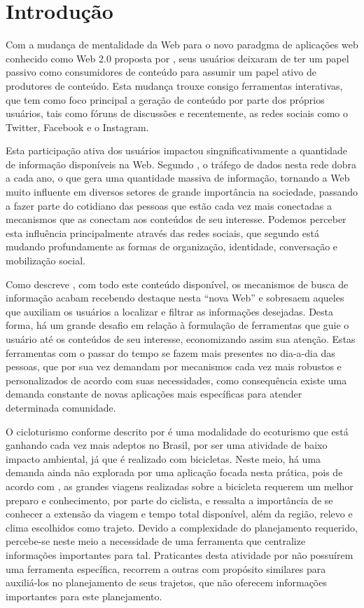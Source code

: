 \section{\esp Introdução}
Com a mudança de mentalidade da Web para o novo paradgma de aplicações web conhecido como Web 2.0 proposta por \cite{web20Proposta}, seus 
usuários deixaram de ter um papel passivo como consumidores de conteúdo para assumir um papel ativo de produtores de conteúdo. Esta mudança 
trouxe consigo ferramentas interativas, que tem como foco principal a geração de conteúdo por parte dos próprios usuários, tais como fóruns 
de discussões e recentemente, as redes sociais como o Twitter, Facebook e o Instagram.

Esta participação ativa dos usuários impactou singnificativamente a quantidade de informação disponíveis na Web. Segundo \cite{artigo01}, 
o tráfego de dados nesta rede dobra a cada ano, o que gera uma quantidade massiva de informação, tornando a Web muito influente em diversos 
setores de grande importância na sociedade, passando a fazer parte do cotidiano das pessoas que estão cada vez mais conectadas a mecanismos que
as  conectam aos conteúdos de seu interesse. Podemos perceber esta influência principalmente através das redes sociais, que segundo 
\cite{redesSociais01} está mudando profundamente as formas de organização, identidade, conversação e mobilização social.

Como descreve \cite{deitelAjax}, com todo este conteúdo disponível, os mecanismos de busca de informação 
acabam recebendo destaque nesta ``nova Web'' e sobresaem aqueles que auxiliam os usuários  a localizar e filtrar 
as informações desejadas. Desta forma, há um grande desafio em relação à formulação de ferramentas que guie o usuário até os conteúdos de seu 
interesse, economizando assim sua atenção. Estas ferramentas com o passar do tempo se fazem mais presentes no dia-a-dia das pessoas, 
que por sua vez demandam por mecanismos cada vez mais robustos e personalizados de acordo com suas necessidades, como consequência existe 
uma demanda constante de novas aplicações mais específicas para atender determinada comunidade.

O cicloturismo conforme descrito por \cite{cicloturismo01} é uma modalidade do ecoturismo que está ganhando cada vez mais adeptos no Brasil,
por ser uma atividade de baixo impacto ambiental, já que é realizado com bicicletas. Neste meio, há uma demanda ainda não explorada por 
uma aplicação focada nesta prática, pois de acordo com \cite{cicloturismo02}, as grandes viagens realizadas sobre a bicicleta requerem um melhor
preparo e conhecimento, por parte do ciclista, e ressalta a importância de se conhecer a extensão da viagem e tempo total disponível, além da 
região, relevo e clima escolhidos como trajeto. Devido a complexidade do planejamento requerido, percebe-se neste meio a necessidade de 
uma ferramenta que centralize informações importantes para tal. Praticantes desta atividade por não possuírem uma ferramenta específica, 
recorrem a outras com propósito similares para auxiliá-los no planejamento de seus trajetos, que não oferecem informações importantes para este 
planejamento.

